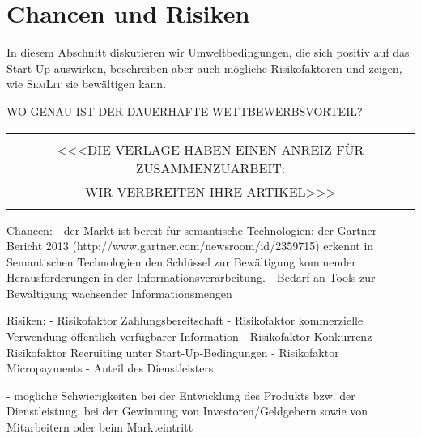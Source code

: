 \section{Chancen und Risiken}
In diesem Abschnitt diskutieren wir Umweltbedingungen, die sich positiv auf das Start-Up auswirken, beschreiben aber auch mögliche Risikofaktoren und zeigen, wie \textsc{SemLit} sie bewältigen kann.


WO GENAU IST DER DAUERHAFTE WETTBEWERBSVORTEIL?

\begin{table}[h!]
  \centering
  \begin{large}
	\begin{itshape}
  \begin{tabular}{c}\hline
  \\
  {\color{orange}<<<DIE VERLAGE HABEN EINEN ANREIZ FÜR ZUSAMMENZUARBEIT: }\\
  {\color{orange}WIR VERBREITEN IHRE ARTIKEL>>> }\\
  \\\hline
  \end{tabular}
	\end{itshape}
  \end{large}
\end{table}


Chancen:
- der Markt ist bereit für semantische Technologien: der Gartner-Bericht 2013 (http://www.gartner.com/newsroom/id/2359715) erkennt in Semantischen Technologien den Schlüssel zur Bewältigung kommender Herausforderungen in der Informationsverarbeitung.
- Bedarf an Tools zur Bewältigung wachsender Informationsmengen


Risiken:
- Risikofaktor Zahlungsbereitschaft
- Risikofaktor kommerzielle Verwendung öffentlich verfügbarer Information 
- Risikofaktor Konkurrenz
- Risikofaktor Recruiting unter Start-Up-Bedingungen
- Risikofaktor Micropayments - Anteil des Dienstleisters


- mögliche Schwierigkeiten bei der Entwicklung des Produkts bzw. der Dienstleistung, bei der Gewinnung von Investoren/Geldgebern sowie von Mitarbeitern oder beim Markteintritt 

